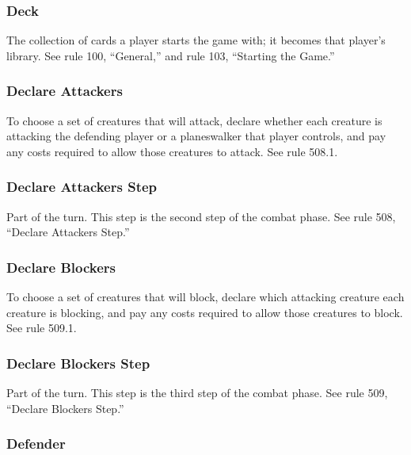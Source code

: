 {{{{{{\subsubsection*{Deck}

The collection of cards a player starts the game with; it becomes that player’s library. See rule 100, “General,” and rule 103, “Starting the Game.”

\subsubsection*{Declare Attackers}

To choose a set of creatures that will attack, declare whether each creature is attacking the defending player or a planeswalker that player controls, and pay any costs required to allow those creatures to attack. See rule 508.1.

\subsubsection*{Declare Attackers Step}

Part of the turn. This step is the second step of the combat phase. See rule 508, “Declare Attackers Step.”

\subsubsection*{Declare Blockers}

To choose a set of creatures that will block, declare which attacking creature each creature is blocking, and pay any costs required to allow those creatures to block. See rule 509.1.

\subsubsection*{Declare Blockers Step}

Part of the turn. This step is the third step of the combat phase. See rule 509, “Declare Blockers Step.”

\subsubsection*{Defender}

}}}}}}
